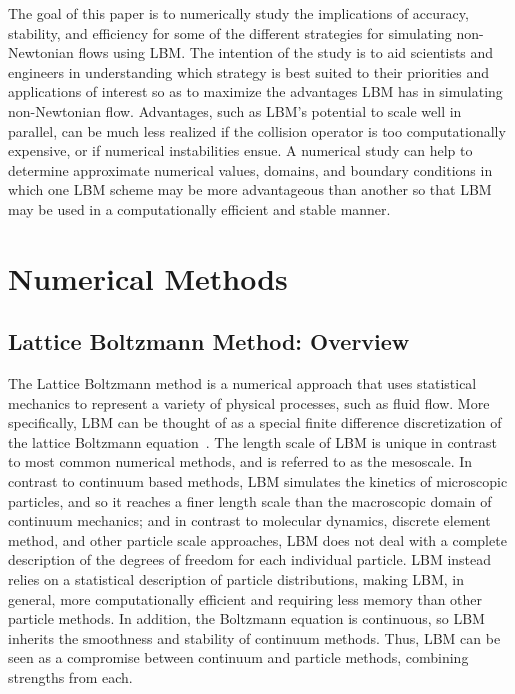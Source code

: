 \documentclass[pdftex,ms]{pittetd}
\begin{document}
The goal of this paper is to numerically study the implications of accuracy, stability, and efficiency for some of the different strategies for simulating non-Newtonian flows using LBM. The intention of the study is to aid scientists and engineers in understanding which strategy is best suited to their priorities and applications of interest so as to maximize the advantages LBM has in simulating non-Newtonian flow.
Advantages, such as LBM's potential to scale well in parallel, can be much less realized if the collision operator is too computationally expensive, or if numerical instabilities ensue.
A numerical study can help to determine approximate numerical values, domains, and boundary conditions in which one LBM scheme may be more advantageous than another so that LBM may be used in a computationally efficient and stable manner.

\section{Numerical Methods}


\subsection{Lattice Boltzmann Method: Overview} \label{sec:LBM}

The Lattice Boltzmann method is a numerical approach that uses statistical mechanics to represent a variety of physical processes, such as fluid flow.
More specifically, LBM can be thought of as a special finite difference discretization of the lattice Boltzmann equation~\cite{chen1998lattice}.
The length scale of LBM is unique in contrast to most common numerical methods, and is referred to as the mesoscale.
In contrast to continuum based methods, LBM simulates the kinetics of microscopic particles, and so it reaches a finer length scale than the macroscopic domain of continuum mechanics; and in contrast to molecular dynamics, discrete element method, and other particle scale approaches, LBM does not deal with a complete description of the degrees of freedom for each individual particle.
LBM instead relies on a statistical description of particle distributions, making LBM, in general, more computationally efficient and requiring less memory than other particle methods.
In addition, the Boltzmann equation is continuous, so LBM inherits the smoothness and stability of continuum methods.
Thus, LBM can be seen as a compromise between continuum and particle methods, combining strengths from each.
\end{document}
